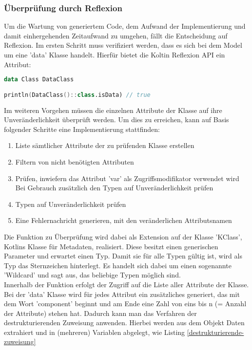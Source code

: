 \subsubsection{Überprüfung durch Reflexion}
Um die Wartung von generiertem Code, dem Aufwand der Implementierung und damit einhergehenden Zeitaufwand zu umgehen, fällt die Entscheidung auf Reflexion. Im ersten Schritt muss verifiziert werden, dass es sich bei dem Model um eine 'data' Klasse handelt. Hierfür bietet die Koltin Reflexion API ein Attribut:
\begin{lstlisting}[caption={Kotlin 'isData' Attribut}, label={lst:data-class}, language=Kotlin]
data Class DataClass

println(DataClass()::class.isData) // true
\end{lstlisting}
\bigskip
Im weiteren Vorgehen müssen die einzelnen Attribute der Klasse auf ihre Unveränderlichkeit überprüft werden. Um dies zu erreichen, kann auf Basis folgender Schritte eine Implementierung stattfinden:
\begin{enumerate}
	\item Liste sämtlicher Attribute der zu prüfenden Klasse erstellen
	\item Filtern von nicht benötigten Attributen
	\item Prüfen, inwiefern das Attribut 'var' als Zugriffsmodifikator verwendet wird
	\subitem Bei Gebrauch zusätzlich den Typen auf Unveränderlichkeit prüfen
	\item Typen auf Unveränderlichkeit prüfen
	\item Eine Fehlernachricht generieren, mit den veränderlichen Attributsnamen
\end{enumerate}
Die Funktion zu Überprüfung wird dabei als Extension auf der Klasse 'KClass', Kotlins Klasse für Metadaten, realisiert. Diese besitzt einen generischen Parameter und erwartet einen Typ. Damit sie für alle Typen gültig ist, wird als Typ das Sternzeichen hinterlegt. Es handelt sich dabei um einen sogenannte 'Wildcard'  und sagt aus, das beliebige Typen möglich sind.
\\
Innerhalb der Funktion erfolgt der Zugriff auf die Liste aller Attribute der Klasse.
Bei der 'data' Klasse wird für jedes Attribut ein zusätzliches generiert, das mit dem Wort 'component' beginnt und am Ende eine Zahl von eins bis n (= Anzahl der Attribute) stehen hat. Dadurch kann man das Verfahren der destrukturierenden Zuweisung anwenden. Hierbei werden aus dem Objekt Daten extrahiert und in (mehreren) Variablen abgelegt, wie Listing
\ref{destrukturierende-zuweisung}
